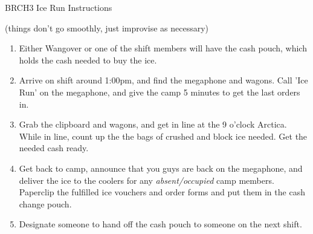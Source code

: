 \documentclass[letterpaper]{letter}
\begin{document}
\large

\begin{center}
\Huge
BRCH3 Ice Run Instructions
\end{center}

\hspace{1cm}

(things don't go smoothly, just improvise as necessary)

\hspace{1cm}

\begin{enumerate}
  \item Either Wangover or one of the shift members will have the cash pouch, which holds the cash needed to buy the ice.
  \item Arrive on shift around 1:00pm, and find the megaphone and wagons. Call 'Ice Run' on the megaphone, and give the camp 5 minutes to get the last orders in.
  \item Grab the clipboard and wagons, and get in line at the 9 o'clock Arctica. While in line, count up the the bags of crushed and block ice needed. Get the needed cash ready.
  \item Get back to camp, announce that you guys are back on the megaphone, and deliver the ice to the coolers for any \emph{absent/occupied} camp members. Paperclip the fulfilled ice vouchers and order forms and put them in the cash change pouch.
  \item Designate someone to hand off the cash pouch to someone on the next shift.
\end{enumerate}
\end{document}
